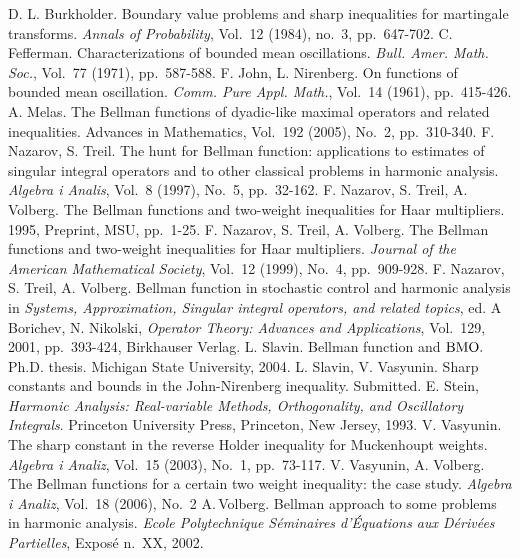 \documentclass[psamsfonts]{conm-p-l}
\theoremstyle{definition}
\theoremstyle{remark}
\numberwithin{equation}{section}
\begin{document}
\begin{thebibliography}{AAAA}
D. L. Burkholder. Boundary value problems and sharp inequalities for martingale transforms. {\it Annals of Probability}, Vol.~12 (1984), no.~3, pp.~647-702.
C. Fefferman. Characterizations of bounded mean oscillations. {\it Bull. Amer. Math. Soc.}, Vol.~77 (1971), pp.~587-588.
F. John, L. Nirenberg. On functions of bounded mean oscillation. {\it Comm. Pure Appl. Math.}, Vol.~14 (1961), pp.~415-426.
A. Melas. The Bellman functions of dyadic-like maximal operators and related inequalities. {Advances in Mathematics}, Vol.~192 (2005), No.~2, pp.~310-340.
F. Nazarov, S. Treil. The hunt for Bellman function: applications to estimates of singular integral operators and to other classical problems in harmonic analysis. {\it Algebra i Analis}, Vol.~8 (1997), No.~5, pp.~32-162.
F. Nazarov, S. Treil, A. Volberg. The Bellman functions and two-weight inequalities for Haar multipliers. 1995, Preprint, MSU, pp.~1-25.
F. Nazarov, S. Treil, A. Volberg. The Bellman functions and two-weight inequalities for Haar multipliers. {\it Journal of the American Mathematical Society}, Vol.~12 (1999), No.~4, pp.~909-928.
F. Nazarov, S. Treil, A. Volberg. Bellman function in stochastic control and harmonic analysis in {\it Systems, Approximation, Singular integral operators, and related topics}, ed. A Borichev, N. Nikolski, {\it Operator Theory: Advances and Applications}, Vol.~129, 2001, pp.~393-424, Birkhauser Verlag.
L. Slavin. Bellman function and ${{\rm{BMO}}}.$ Ph.D. thesis. Michigan State University, 2004.
L. Slavin, V. Vasyunin. Sharp constants and bounds in the John-Nirenberg inequality. Submitted.
E. Stein, {\it Harmonic Analysis: Real-variable Methods, Orthogonality, and Oscillatory Integrals}. Princeton University Press, Princeton, New Jersey, 1993.
V. Vasyunin. The sharp constant in the reverse Holder inequality for Muckenhoupt weights. {\it Algebra i Analiz}, Vol.~15 (2003), No.~1, pp.~73-117.
V. Vasyunin, A. Volberg. The Bellman functions for a certain two weight inequality: the case study. {\it Algebra i Analiz}, Vol.~18 (2006), No.~2
A.\,Volberg. Bellman approach to some problems in harmonic analysis. {\it Ecole Polytechnique S\'eminaires d'\'{E}qua\-tions aux D\'{e}riv\'{e}es Partielles}, Expos\'{e} n.~XX, 2002.
\end{thebibliography}
\end{document}
